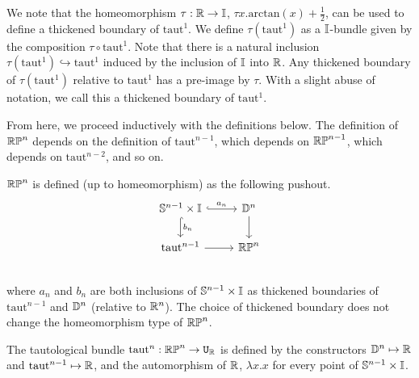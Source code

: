 \documentclass{amsart}
\begin{document}
We note that the homeomorphism $\tau: \mathbb{R} \rightarrow \mathbb{I}$, $\tau x. \text{arctan}(x)+ \frac{1}{2}$, can be used to define a thickened boundary of $\text{taut}^1$. We define $\tau(\text{taut}^1)$ as a $\mathbb{I}$-bundle given by the composition $\tau \circ \text{taut}^1$.  Note that there is a natural inclusion $\tau(\text{taut}^1) \hookrightarrow \text{taut}^1$ induced by the inclusion of $\mathbb{I}$ into $\mathbb{R}$. Any thickened boundary of $\tau(\text{taut}^1)$ relative to $\text{taut}^1$ has a pre-image by $\tau$. With a slight abuse of notation, we call this a thickened boundary of $\text{taut}^1$. 

From here, we proceed inductively with the definitions below. The definition of $\mathbb{RP}^n$ depends on the definition of $\text{taut}^{n-1}$, which depends on $\mathbb{RP}^{n-1}$, which depends on $\text{taut}^{n-2}$, and so on.

\begin{definition} $\mathbb{RP}^n$ is defined (up to homeomorphism) as the following pushout.\\
\[\begin{tikzcd}
\set{S}^{n-1} \times \set{I} \arrow[r, hook, "a_n"] \arrow[d, hook, "b_n" ] &\set{D}^{n} \arrow[d]\\
\text{taut}^{n-1} \arrow[r] &\set{RP}^n\\
\end{tikzcd}
\] where $a_n$ and $b_n$ are both inclusions of $\mathbb{S}^{n-1} \times \mathbb{I} $ as thickened boundaries of $\text{taut}^{n-1}$ and $\mathbb{D}^{n}$ (relative to $\mathbb{R}^n$). The choice of thickened boundary does not change the homeomorphism type of $\mathbb{RP}^n$.
\end{definition}

\begin{definition}
The tautological bundle $\text{taut}^n: \mathbb{RP}^n \rightarrow \mathtt{U}_{\mathbb{R}}$ is defined by the constructors $\mathbb{D}^n \mapsto \mathbb{R}$ and $\text{taut}^{n-1} \mapsto \mathbb{R}$, and the automorphism of $\mathbb{R}$, $\lambda x.x$ for every point of $\mathbb{S}^{n-1} \times \mathbb{I}$.
\end{definition}

\end{document}
